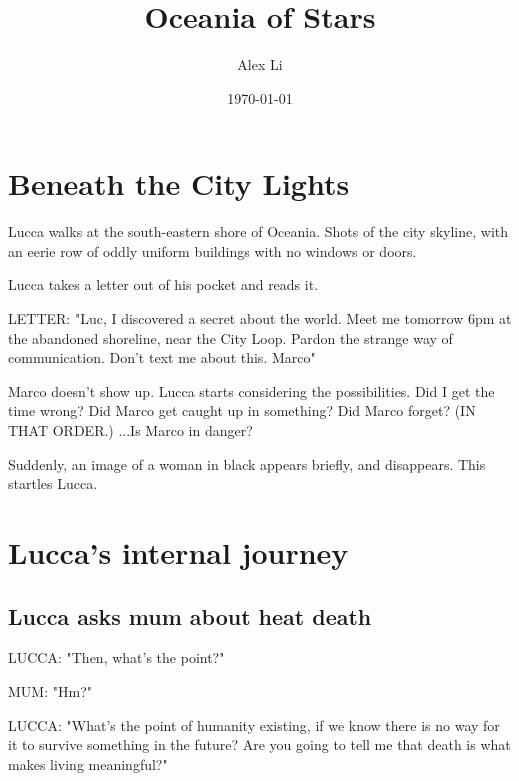 \documentclass[11pt]{article}
\begin{document}
\begin{titlepage}
\title{Oceania of Stars}
\author{Alex Li}
\date{\today} %
\maketitle
\thispagestyle{empty} %
\end{titlepage}



\tableofcontents
\newpage %






\section{Beneath the City Lights}

Lucca walks at the south-eastern shore of Oceania. Shots of the city skyline, with an eerie row of oddly uniform buildings with no windows or doors. 

Lucca takes a letter out of his pocket and reads it.

LETTER: "Luc, I discovered a secret about the world. 
Meet me tomorrow 6pm at the abandoned shoreline, near the City Loop. 
Pardon the strange way of communication. 
Don't text me about this. Marco"

Marco doesn't show up. Lucca starts considering the possibilities. Did I get the time wrong? Did Marco get caught up in something? Did Marco forget? (IN THAT ORDER.) ...Is Marco in danger?

Suddenly, an image of a woman in black appears briefly, and disappears. This startles Lucca. 

\section{Lucca's internal journey}
	\subsection{Lucca asks mum about heat death}
LUCCA: "Then, what's the point?"

MUM: "Hm?"

LUCCA: "What's the point of humanity existing, if we know there is no way for it to survive something in the future?
Are you going to tell me that death is what makes living meaningful?"
\end{document}
